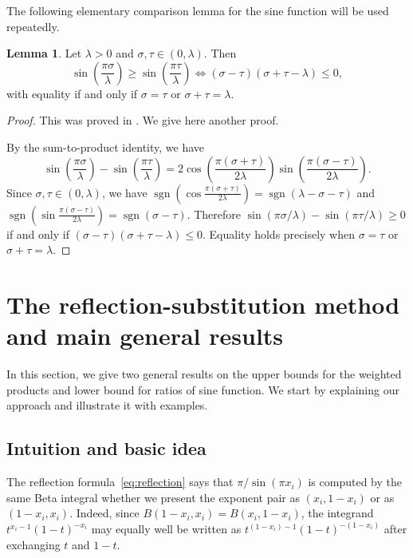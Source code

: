 \documentclass[12pt]{amsart}
\theoremstyle{definition}
\newtheorem{lemma}{Lemma}[section]
\begin{document}
The following elementary comparison lemma for the sine function will be used repeatedly.

\begin{lemma}\label{lem:sine-compare}
Let $\lambda > 0$ and $\sigma,\tau \in (0,\lambda)$. Then
\[
\sin\left(\frac{\pi\sigma}{\lambda}\right) \geq \sin\left(\frac{\pi\tau}{\lambda}\right) \iff (\sigma-\tau)(\sigma+\tau-\lambda) \leq 0,
\]
with equality if and only if $\sigma = \tau$ or $\sigma + \tau = \lambda$.
\end{lemma}

\begin{proof}
This was proved in \cite{MSW2026}. We give here another proof.

By the sum-to-product identity, we have
\[
\sin\left(\frac{\pi\sigma}{\lambda}\right) - \sin\left(\frac{\pi\tau}{\lambda}\right) = 2\cos\left(\frac{\pi(\sigma+\tau)}{2\lambda}\right)\sin\left(\frac{\pi(\sigma-\tau)}{2\lambda}\right).
\]
Since $\sigma,\tau \in (0,\lambda)$, we have $\operatorname{sgn}(\cos \frac{\pi(\sigma+\tau)}{2\lambda}) = \operatorname{sgn}(\lambda-\sigma-\tau)$ and $\operatorname{sgn}(\sin \frac{\pi(\sigma-\tau)}{2\lambda}) = \operatorname{sgn}(\sigma-\tau)$. Therefore $\sin(\pi\sigma/\lambda) - \sin(\pi\tau/\lambda) \geq 0$ if and only if $(\sigma-\tau)(\sigma+\tau-\lambda) \leq 0$. Equality holds precisely when $\sigma=\tau$ or $\sigma+\tau=\lambda$.
\end{proof}


\section{The reflection-substitution method and main general results}
\label{sec:method}
In this section, we give two general results on the upper bounds for the weighted products and lower bound for ratios of sine function. We start by explaining our approach and illustrate it with examples.
\subsection{Intuition and basic idea}

The reflection formula~\eqref{eq:reflection} says that $\pi/\sin(\pi x_i)$ is computed by the same Beta integral whether we present the exponent pair as $(x_i,1-x_i)$ or as $(1-x_i,x_i)$. Indeed, since $B(1-x_i,x_i)=B(x_i,1-x_i)$, the integrand $t^{x_i-1}(1-t)^{-x_i}$ may equally well be written as $t^{(1-x_i)-1}(1-t)^{-(1-x_i)}$ after exchanging $t$ and $1-t$.
\end{document}
